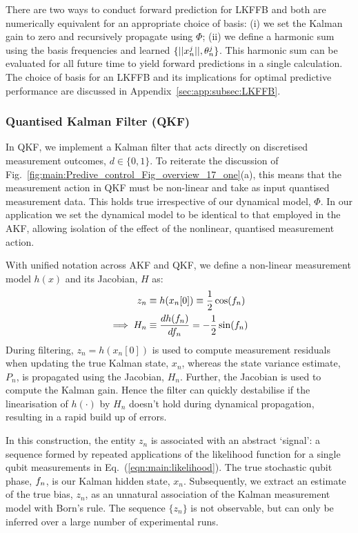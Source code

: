 There are two ways to conduct forward prediction for LKFFB and both are numerically equivalent for an appropriate choice of basis: (i) we set the Kalman gain to zero and recursively propagate using $\Phi$; (ii) we define a harmonic sum using the basis frequencies and learned $\{||x^j_n||, \theta^{j}_{n} \}$.  This harmonic sum can be evaluated for all future time to yield forward predictions in a single calculation. The choice of basis for an LKFFB and its implications for optimal predictive performance are discussed in Appendix~\ref{sec:app:subsec:LKFFB}.





\subsubsection{Quantised Kalman Filter (QKF)}

In QKF, we implement a Kalman filter that acts directly on discretised measurement outcomes, $d \in \{0,1\}$. To reiterate the discussion of  Fig.~\ref{fig:main:Predive_control_Fig_overview_17_one}(a), this means that the measurement action in QKF must be non-linear and take as input quantised measurement data. This holds true irrespective of our dynamical model, $\Phi$.  In our application we set the dynamical model to be identical to that employed in the AKF, allowing isolation of the effect of the nonlinear, quantised measurement action.

With unified notation across AKF and QKF, we define a non-linear measurement model $h(x)$ and its Jacobian, $H$ as:
\begin{align}
	z_n &  \equiv h(x_n[0]) \equiv \frac{1}{2}\cos(f_{n}) \\
	\implies H_n &\equiv \frac{d h(f_n)}{df_n} =  -\frac{1}{2}\sin(f_{n})
\end{align}
During filtering, $z_n = h(x_n[0])$ is used to compute measurement residuals when updating the true Kalman state, $x_n$, whereas the state variance estimate, $P_n$, is propagated using the Jacobian, $H_n$. Further, the Jacobian  is used to compute the Kalman gain. Hence the filter can quickly destabilise if the linearisation of $h(\cdot)$ by $H_n$ doesn't hold during dynamical propagation, resulting in a rapid build up of errors. 

In this construction, the entity $z_n$ is associated with an abstract `signal': a sequence formed by repeated applications of the likelihood function for a single qubit measurements in Eq.~(\ref {eqn:main:likelihood}).  The true stochastic qubit phase, $f_n$, is our Kalman hidden state, $x_n$. Subsequently, we extract an estimate of the true bias, $z_n$, as an unnatural association of the Kalman measurement model with Born's rule. The sequence $\{z_n\}$ is not observable, but can only be inferred over a large number of experimental runs. 

